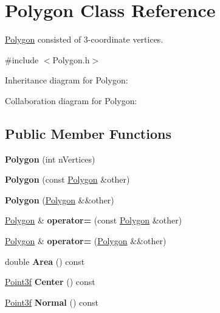 \hypertarget{class_polygon}{}\section{Polygon Class Reference}
\label{class_polygon}


\mbox{\hyperlink{class_polygon}{Polygon}} consisted of 3-\/coordinate vertices.  




{\ttfamily \#include $<$Polygon.\+h$>$}



Inheritance diagram for Polygon\+:


Collaboration diagram for Polygon\+:
\subsection*{Public Member Functions}
\begin{DoxyCompactItemize}
\item 
\mbox{\label{class_polygon_a30007de4ec1b150d50714a6bde4fb79d}} 
{\bfseries Polygon} (int n\+Vertices)
\item 
\mbox{\label{class_polygon_a117451a285cc0c9d443638cd449e032b}} 
{\bfseries Polygon} (const \mbox{\hyperlink{class_polygon}{Polygon}} \&other)
\item 
\mbox{\label{class_polygon_ad8fc5651b8c9161a8b47b49eff09fe9c}} 
{\bfseries Polygon} (\mbox{\hyperlink{class_polygon}{Polygon}} \&\&other)
\item 
\mbox{\label{class_polygon_a073ed9d24fca614f09b23b0ed6571e36}} 
\mbox{\hyperlink{class_polygon}{Polygon}} \& {\bfseries operator=} (const \mbox{\hyperlink{class_polygon}{Polygon}} \&other)
\item 
\mbox{\label{class_polygon_a90dd4293d3da213a7d313fd3f36b354b}} 
\mbox{\hyperlink{class_polygon}{Polygon}} \& {\bfseries operator=} (\mbox{\hyperlink{class_polygon}{Polygon}} \&\&other)
\item 
\mbox{\label{class_polygon_a93e54fdbdb5a7de543eccbed07e0f7c8}} 
double {\bfseries Area} () const
\item 
\mbox{\label{class_polygon_a8f283e92255018b9f8331e24aaf75c57}} 
\mbox{\hyperlink{struct_point3f}{Point3f}} {\bfseries Center} () const
\item 
\mbox{\label{class_polygon_a2b1fae8937c3b44cce5022d2eee61f31}} 
\mbox{\hyperlink{struct_point3f}{Point3f}} {\bfseries Normal} () const
\end{DoxyCompactItemize}
